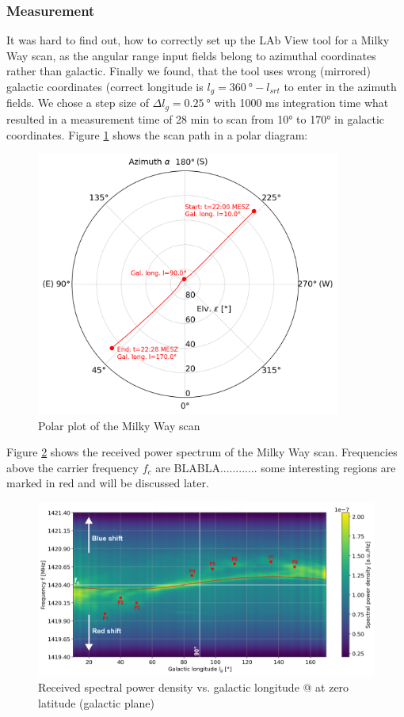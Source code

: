 \subsubsection{Measurement}
It was hard to find out, how to correctly set up the LAb View tool for a Milky Way scan, as the angular range input fields belong to azimuthal coordinates rather than galactic. Finally we found, that the tool uses wrong (mirrored) galactic coordinates (correct longitude is $l_g=\SI{360}{\degree}-l_{srt}$ to enter in the azimuth fields. We chose a step size of $\Delta l_g=\SI{0.25}{\degree}$ with 1000 ms integration time what resulted in a measurement time of 28 min to scan from 10° to 170° in galactic coordinates. Figure \ref{fig:mw_scan_polar} shows the scan path in a polar diagram:

\begin{figure}[H]
    \centering
    \includegraphics[width=10cm]{assets/mw_scan_polar.png}
    \caption{Polar plot of the Milky Way scan}
    \label{fig:mw_scan_polar}
\end{figure}

Figure \ref{fig:mw_spectrum_plot} shows the received power spectrum of the Milky Way scan. Frequencies above the carrier frequency $f_c$ are BLABLA............
some interesting regions are marked in red and will be discussed later.


\begin{figure}[H]
    \centering
    \includegraphics[width=\textwidth]{assets/spectrum_plot_edit.png}
    \caption{Received spectral power density vs. galactic longitude @ at zero latitude (galactic plane)}
    \label{fig:mw_spectrum_plot}
\end{figure}

